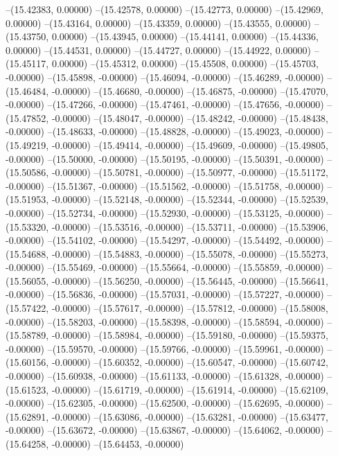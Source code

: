 --(15.42383, 0.00000)
--(15.42578, 0.00000)
--(15.42773, 0.00000)
--(15.42969, 0.00000)
--(15.43164, 0.00000)
--(15.43359, 0.00000)
--(15.43555, 0.00000)
--(15.43750, 0.00000)
--(15.43945, 0.00000)
--(15.44141, 0.00000)
--(15.44336, 0.00000)
--(15.44531, 0.00000)
--(15.44727, 0.00000)
--(15.44922, 0.00000)
--(15.45117, 0.00000)
--(15.45312, 0.00000)
--(15.45508, 0.00000)
--(15.45703, -0.00000)
--(15.45898, -0.00000)
--(15.46094, -0.00000)
--(15.46289, -0.00000)
--(15.46484, -0.00000)
--(15.46680, -0.00000)
--(15.46875, -0.00000)
--(15.47070, -0.00000)
--(15.47266, -0.00000)
--(15.47461, -0.00000)
--(15.47656, -0.00000)
--(15.47852, -0.00000)
--(15.48047, -0.00000)
--(15.48242, -0.00000)
--(15.48438, -0.00000)
--(15.48633, -0.00000)
--(15.48828, -0.00000)
--(15.49023, -0.00000)
--(15.49219, -0.00000)
--(15.49414, -0.00000)
--(15.49609, -0.00000)
--(15.49805, -0.00000)
--(15.50000, -0.00000)
--(15.50195, -0.00000)
--(15.50391, -0.00000)
--(15.50586, -0.00000)
--(15.50781, -0.00000)
--(15.50977, -0.00000)
--(15.51172, -0.00000)
--(15.51367, -0.00000)
--(15.51562, -0.00000)
--(15.51758, -0.00000)
--(15.51953, -0.00000)
--(15.52148, -0.00000)
--(15.52344, -0.00000)
--(15.52539, -0.00000)
--(15.52734, -0.00000)
--(15.52930, -0.00000)
--(15.53125, -0.00000)
--(15.53320, -0.00000)
--(15.53516, -0.00000)
--(15.53711, -0.00000)
--(15.53906, -0.00000)
--(15.54102, -0.00000)
--(15.54297, -0.00000)
--(15.54492, -0.00000)
--(15.54688, -0.00000)
--(15.54883, -0.00000)
--(15.55078, -0.00000)
--(15.55273, -0.00000)
--(15.55469, -0.00000)
--(15.55664, -0.00000)
--(15.55859, -0.00000)
--(15.56055, -0.00000)
--(15.56250, -0.00000)
--(15.56445, -0.00000)
--(15.56641, -0.00000)
--(15.56836, -0.00000)
--(15.57031, -0.00000)
--(15.57227, -0.00000)
--(15.57422, -0.00000)
--(15.57617, -0.00000)
--(15.57812, -0.00000)
--(15.58008, -0.00000)
--(15.58203, -0.00000)
--(15.58398, -0.00000)
--(15.58594, -0.00000)
--(15.58789, -0.00000)
--(15.58984, -0.00000)
--(15.59180, -0.00000)
--(15.59375, -0.00000)
--(15.59570, -0.00000)
--(15.59766, -0.00000)
--(15.59961, -0.00000)
--(15.60156, -0.00000)
--(15.60352, -0.00000)
--(15.60547, -0.00000)
--(15.60742, -0.00000)
--(15.60938, -0.00000)
--(15.61133, -0.00000)
--(15.61328, -0.00000)
--(15.61523, -0.00000)
--(15.61719, -0.00000)
--(15.61914, -0.00000)
--(15.62109, -0.00000)
--(15.62305, -0.00000)
--(15.62500, -0.00000)
--(15.62695, -0.00000)
--(15.62891, -0.00000)
--(15.63086, -0.00000)
--(15.63281, -0.00000)
--(15.63477, -0.00000)
--(15.63672, -0.00000)
--(15.63867, -0.00000)
--(15.64062, -0.00000)
--(15.64258, -0.00000)
--(15.64453, -0.00000)
